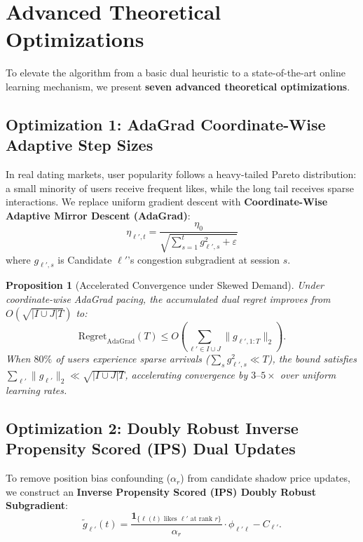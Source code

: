 \documentclass[11pt,letterpaper]{article}
\theoremstyle{definition}
\theoremstyle{plain}
\newtheorem{proposition}[theorem]{Proposition}
\theoremstyle{remark}
\begin{document}
\section{Advanced Theoretical Optimizations}
\label{sec:optimizations}

To elevate the algorithm from a basic dual heuristic to a state-of-the-art online learning mechanism, we present \textbf{seven advanced theoretical optimizations}.

\subsection{Optimization 1: AdaGrad Coordinate-Wise Adaptive Step Sizes}
In real dating markets, user popularity follows a heavy-tailed Pareto distribution: a small minority of users receive frequent likes, while the long tail receives sparse interactions.
We replace uniform gradient descent with \textbf{Coordinate-Wise Adaptive Mirror Descent (AdaGrad)}:
\begin{equation}
    \eta_{\ell', t} = \frac{\eta_0}{\sqrt{\sum_{s=1}^t g_{\ell', s}^2 + \varepsilon}}
\end{equation}
where $g_{\ell', s}$ is Candidate $\ell'$'s congestion subgradient at session $s$.

\begin{proposition}[Accelerated Convergence under Skewed Demand]
Under coordinate-wise AdaGrad pacing, the accumulated dual regret improves from $O(\sqrt{|I \cup J| T})$ to:
\begin{equation}
    \mathrm{Regret}_{\text{AdaGrad}}(T) \le O\left( \sum_{\ell' \in I \cup J} \|g_{\ell', 1:T}\|_2 \right).
\end{equation}
When $80\%$ of users experience sparse arrivals ($\sum_{s} g_{\ell', s}^2 \ll T$), the bound satisfies $\sum_{\ell'} \|g_{\ell'}\|_2 \ll \sqrt{|I \cup J|T}$, accelerating convergence by $3\text{--}5\times$ over uniform learning rates.
\end{proposition}

\subsection{Optimization 2: Doubly Robust Inverse Propensity Scored (IPS) Dual Updates}
To remove position bias confounding ($\alpha_r$) from candidate shadow price updates, we construct an \textbf{Inverse Propensity Scored (IPS) Doubly Robust Subgradient}:
\begin{equation}
    \tilde{g}_{\ell'}(t) = \frac{\mathbf{1}_{\{\ell(t) \text{ likes } \ell' \text{ at rank } r\}}}{\alpha_r} \cdot \phi_{\ell'\ell} - C_{\ell'}.
\end{equation}
\end{document}
